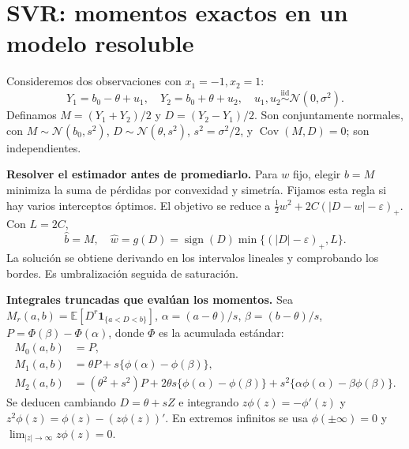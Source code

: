 \documentclass[11pt,a4paper]{article}
\newcommand{\E}{\mathbb E}
\newcommand{\ind}{\mathbf 1}
\newcommand{\abs}[1]{\left\lvert #1\right\rvert}
\DeclareMathOperator{\Cov}{Cov}
\DeclareMathOperator{\sign}{sign}
\newcommand{\Normal}{\mathcal N}
\newcommand{\topic}[2]{\clearpage\section{#1}\label{#2}}
\theoremstyle{definition}\newtheorem{definicion}[teorema]{Definición}
\begin{document}
\topic{SVR: momentos exactos en un modelo resoluble}{s53}
Consideremos dos observaciones con $x_1=-1,x_2=1$:
\[
Y_1=b_0-\theta+u_1,\quad Y_2=b_0+\theta+u_2,\quad
u_1,u_2\stackrel{\mathrm{iid}}{\sim}\Normal(0,\sigma^2).
\]
Definamos $M=(Y_1+Y_2)/2$ y $D=(Y_2-Y_1)/2$.
Son conjuntamente normales, con
$M\sim\Normal(b_0,s^2)$, $D\sim\Normal(\theta,s^2)$,
$s^2=\sigma^2/2$, y $\Cov(M,D)=0$; son independientes.

\textbf{Resolver el estimador antes de promediarlo.}
Para $w$ fijo, elegir $b=M$ minimiza la suma de pérdidas por convexidad y
simetría. Fijamos esta regla si hay varios interceptos óptimos.
El objetivo se reduce a
$\tfrac12w^2+2C(\abs{D-w}-\varepsilon)_+$.
Con $L=2C$,
\[
\boxed{\widehat b=M,\quad
\widehat w=g(D)=\sign(D)\min\{(\abs D-\varepsilon)_+,L\}}.
\]
La solución se obtiene derivando en los intervalos lineales y comprobando
los bordes. Es umbralización seguida de saturación.

\textbf{Integrales truncadas que evalúan los momentos.}
Sea $M_r(a,b)=\E[D^r\ind_{\{a<D<b\}}]$,
$\alpha=(a-\theta)/s$, $\beta=(b-\theta)/s$,
$P=\Phi(\beta)-\Phi(\alpha)$, donde $\Phi$ es la acumulada estándar:
\[
\begin{aligned}
M_0(a,b)&=P,\\
M_1(a,b)&=\theta P+s\{\phi(\alpha)-\phi(\beta)\},\\
M_2(a,b)&=(\theta^2+s^2)P+
2\theta s\{\phi(\alpha)-\phi(\beta)\}
+s^2\{\alpha\phi(\alpha)-\beta\phi(\beta)\}.
\end{aligned}
\]
Se deducen cambiando $D=\theta+sZ$ e integrando
$z\phi(z)=-\phi'(z)$ y $z^2\phi(z)=\phi(z)-(z\phi(z))'$.
En extremos infinitos se usa $\phi(\pm\infty)=0$ y
$\lim_{\abs z\to\infty}z\phi(z)=0$.
\end{document}
